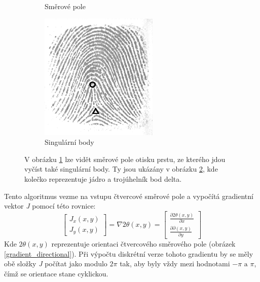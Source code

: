 \begin{figure}[h]
\begin{subfigure}{0.3\textwidth}
    \caption{Směrové pole}
    \label{ds_b}
    \end{subfigure}
    \begin{subfigure}{0.3\textwidth}
    \includegraphics[width=0.9\linewidth]{obrazky-figures/fingerprint3.png}\hfill
    \caption{Singulární body}
    \label{ds_c}
    \end{subfigure}
    \caption{V obrázku \ref{ds_b} lze vidět směrové pole otisku prstu, ze kterého jdou vyčíst také singulární body. Ty jsou ukázány v obrázku \ref{ds_c}, kde kolečko reprezentuje jádro a trojúhelník bod delta\protect\footnotemark{}.}
    \label{directional_singular}
\end{figure} 
Tento algoritmus vezme na vstupu čtvercové směrové pole a vypočítá gradientní vektor \textit{J} pomocí této rovnice:
\begin{equation}
\left[\begin{array}{l}
J_x(x, y) \\
J_y(x, y)
\end{array}\right]=\nabla 2 \theta(x, y)=\left[\begin{array}{l}
\frac{\partial 2 \theta(x, y)}{\partial x} \\
\frac{\partial \partial(x, y)}{\partial y}
\end{array}\right]
\end{equation}
Kde \begin{math}2 \theta(x, y)\end{math} reprezentuje orientaci čtvercového směrového pole (obrázek \ref{gradient_directional}).
Při výpočtu diskrétní verze tohoto gradientu by se měly obě složky \textit{J} počítat jako modulo \begin{math}2\pi\end{math} tak, aby byly vždy mezi hodnotami \begin{math}-\pi \text{ a } \pi\end{math}, čímž se orientace stane cyklickou.

